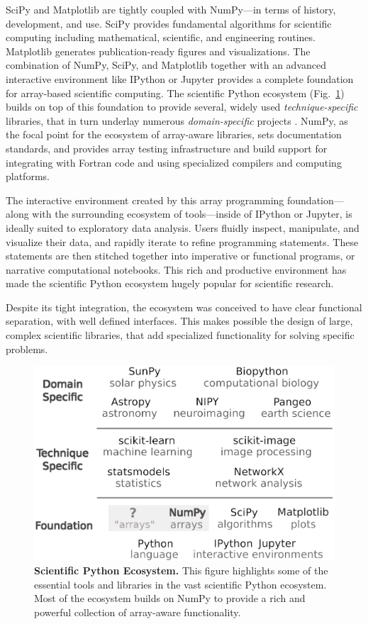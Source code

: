 SciPy and Matplotlib are tightly coupled with NumPy---in terms of
history, development, and use.
SciPy provides fundamental algorithms for scientific computing
including mathematical, scientific, and engineering routines.
Matplotlib generates publication-ready figures and visualizations.
The combination of NumPy, SciPy, and Matplotlib together with
an advanced interactive environment like IPython \cite{perez2007ipython}
or Jupyter \cite{Kluyver:2016aa}
provides a complete foundation for array-based scientific computing.
The scientific Python ecosystem (Fig.~\ref{fig:ecosystem}) builds on top of
this foundation to provide several, widely used \emph{technique-specific}
libraries\cite{pedregosa2011scikit,vanderwalt2014scikit,SciPyProceedings_11},
that in turn underlay numerous \emph{domain-specific} projects
\cite{astropy:2013,astropy:2018,cock2009biopython,millman2007analysis,sunpy2015,2018EGUGA..2012146H}.
NumPy, as the focal point for the ecosystem of array-aware libraries,
sets documentation standards, and provides array testing infrastructure
and build support for integrating with Fortran code and using specialized
compilers and computing platforms.

The interactive environment created by this array programming
foundation---along with the surrounding ecosystem of tools---inside of
IPython or Jupyter, is ideally suited to exploratory data analysis.
Users fluidly inspect, manipulate, and visualize their data, and
rapidly iterate to refine programming statements. These statements are
then stitched together into imperative or functional programs, or
narrative computational notebooks.  This rich and productive
environment has made the scientific Python ecosystem hugely popular
for scientific research.

Despite its tight integration, the ecosystem was conceived to have
clear functional separation, with well defined interfaces.  This makes
possible the design of large, complex scientific libraries, that
add specialized functionality for solving specific problems.


\begin{figure}
  \centering
  \includegraphics[width=.45\textwidth]{static/ecosystem}
  \caption{\textbf{Scientific Python Ecosystem.}
   This figure highlights some of the essential tools and libraries in the vast
   scientific Python ecosystem.  Most of the ecosystem builds on NumPy to
   provide a rich and powerful collection of array-aware functionality.
  }
  \label{fig:ecosystem}
\end{figure}

